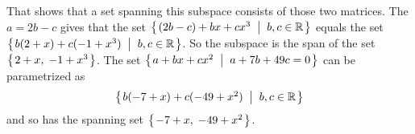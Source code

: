 \begin{Answer}
          That shows that a set spanning this subspace consists of those
          two matrices.
\Question The $a=2b-c$ gives that the set
           \( \mbox{$\left\{\hspace{0.1em}(2b-c)+bx+cx^3 \;\;\middle|\;\; b,c\in\mathbb{R}\hspace{0.1em}\right\}$} \)
           equals the set
           \( \mbox{$\left\{\hspace{0.1em}b(2+x)+c(-1+x^3) \;\;\middle|\;\; b,c\in\mathbb{R}\hspace{0.1em}\right\}$}  \).
           So the subspace is the span of the set $\mbox{$\left\{\hspace{0.1em}2+x,\; -1+x^3\hspace{0.1em}\right\}$}$.
\Question The set
          \( \mbox{$\left\{\hspace{0.1em}a+bx+cx^2\;\;\middle|\;\; a+7b+49c=0\hspace{0.1em}\right\}$} \)
          can be parametrized as
          \begin{equation*}
            \mbox{$\left\{\hspace{0.1em}b(-7+x)+c(-49+x^2)\;\;\middle|\;\; b,c\in\mathbb{R}\hspace{0.1em}\right\}$} 
          \end{equation*}
          and so 
          has the spanning set $\mbox{$\left\{\hspace{0.1em}-7+x,\;-49+x^2\hspace{0.1em}\right\}$}$.

\end{Answer}
